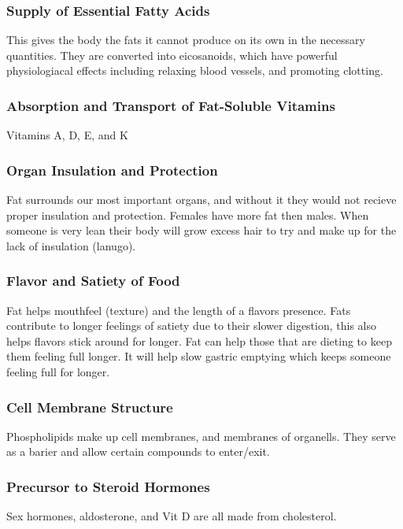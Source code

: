 \documentclass[letterpaper, 11pt]{article}
\begin{document}
\subsubsection{Supply of Essential Fatty Acids}
\label{sec:org52a4180}
This gives the body the fats it cannot produce on its own in the necessary quantities. They are converted into eicosanoids, which have powerful physiologiacal effects including relaxing blood vessels, and promoting clotting.\\
\subsubsection{Absorption and Transport of Fat-Soluble Vitamins}
\label{sec:org5f11ed8}
Vitamins A, D, E, and K\\
\subsubsection{Organ Insulation and Protection}
\label{sec:org63b214c}
Fat surrounds our most important organs, and without it they would not recieve proper insulation and protection. Females have more fat then males. When someone is very lean their body will grow excess hair to try and make up for the lack of insulation (lanugo).\\
\subsubsection{Flavor and Satiety of Food}
\label{sec:orgea39f37}
Fat helps mouthfeel (texture) and the length of a flavors presence. Fats contribute to longer feelings of satiety due to their slower digestion, this also helps flavors stick around for longer. Fat can help those that are dieting to keep them feeling full longer. It will help slow gastric emptying which keeps someone feeling full for longer.\\
\subsubsection{Cell Membrane Structure}
\label{sec:org565a7ea}
Phospholipids make up cell membranes, and membranes of organells. They serve as a barier and allow certain compounds to enter/exit.\\
\subsubsection{Precursor to Steroid Hormones}
\label{sec:org1b2977a}
Sex hormones, aldosterone, and Vit D are all made from cholesterol.\\
\end{document}
